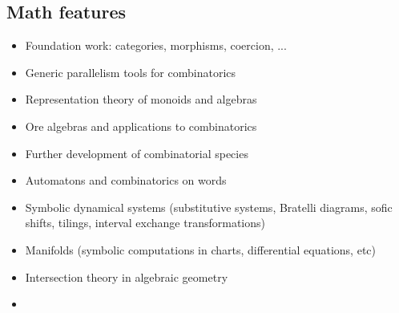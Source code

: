 \subsection{Math features}

\begin{itemize}
\item Foundation work: categories, morphisms, coercion, ...
\item Generic parallelism tools for combinatorics
\item Representation theory of monoids and algebras
\item Ore algebras and applications to combinatorics
\item Further development of combinatorial species
\item Automatons and combinatorics on words
\item Symbolic dynamical systems (substitutive systems, Bratelli diagrams,
  sofic shifts, tilings, interval exchange transformations)
\item Manifolds (symbolic computations in charts, differential equations, etc)
\item Intersection theory in algebraic geometry
\item {}
\end{itemize}

